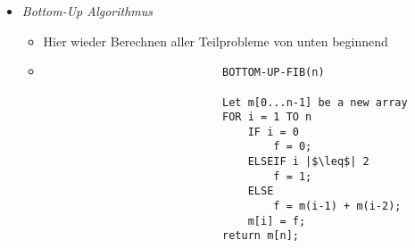 \begin{itemize}
\begin{itemize}
\begin{itemize}
\begin{verbatim}
                            IF m[n-1] != 0
                                return m[n-1];      // Auslesen von gespeicherten Werten
                            IF n |$\leq$| 2
                                f = 1;
                            ELSE
                                f = MEMOIZED-FIB-AUX(n-1, m) + MEMOIZED-FIB-AUX(n-2, m);
                            m[n-1] = f;
                            return f;
                            \end{verbatim}
                    \end{itemize}
                \item \textit{Bottom-Up Algorithmus}
                    \begin{itemize}
                        \item Hier wieder Berechnen aller Teilprobleme von unten beginnend
                        \item[]
                            \begin{verbatim}
                            BOTTOM-UP-FIB(n)

                            Let m[0...n-1] be a new array
                            FOR i = 1 TO n
                                IF i = 0
                                    f = 0;
                                ELSEIF i |$\leq$| 2
                                    f = 1;
                                ELSE
                                    f = m(i-1) + m(i-2);
                                m[i] = f;
                            return m[n];
                            \end{verbatim}
                    \end{itemize}
            \end{itemize}
    \end{itemize}

